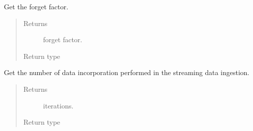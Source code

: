 \documentclass[letterpaper,10pt,english]{sphinxmanual}
\begin{document}
\begin{fulllineitems}
\begin{fulllineitems}
\begin{quote}
\begin{description}
\end{description}\end{quote}

\end{fulllineitems}


\begin{fulllineitems}
\label{\detokenize{index:pyparsvd.parsvd_base.ParSVD_Base.ff}}
\sphinxAtStartPar
Get the forget factor.
\begin{quote}\begin{description}
\item[{Returns}] \leavevmode
\sphinxAtStartPar
forget factor.

\item[{Return type}] \leavevmode
\sphinxAtStartPar
{}

\end{description}\end{quote}

\end{fulllineitems}


\begin{fulllineitems}
\label{\detokenize{index:pyparsvd.parsvd_base.ParSVD_Base.iteration}}
\sphinxAtStartPar
Get the number of data incorporation performed          in the streaming data ingestion.
\begin{quote}\begin{description}
\item[{Returns}] \leavevmode
\sphinxAtStartPar
iterations.

\item[{Return type}] \leavevmode
\sphinxAtStartPar
{}

\end{description}\end{quote}

\end{fulllineitems}



\end{fulllineitems}
\end{document}
